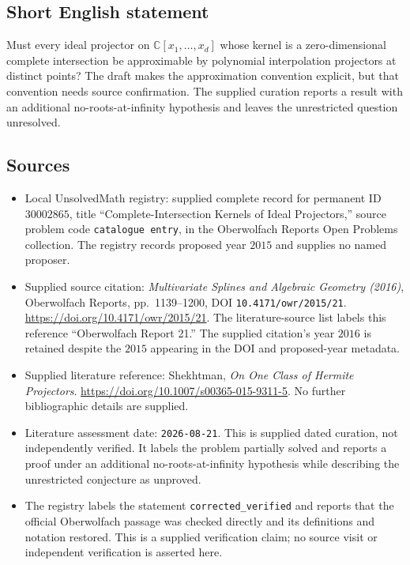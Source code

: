 \documentclass[11pt]{article}
\newcommand{\C}{\mathbb{C}}
\begin{document}
\subsection{Short English statement}
Must every ideal projector on \(\C[x_1,\ldots,x_d]\) whose kernel is a zero-dimensional complete intersection be approximable by polynomial interpolation projectors at distinct points? The draft makes the approximation convention explicit, but that convention needs source confirmation. The supplied curation reports a result with an additional no-roots-at-infinity hypothesis and leaves the unrestricted question unresolved.
\subsection{Sources}
\begin{itemize}
\item Local UnsolvedMath registry: supplied complete record for permanent ID \(30002865\), title ``Complete-Intersection Kernels of Ideal Projectors,'' source problem code \texttt{catalogue entry}, in the Oberwolfach Reports Open Problems collection. The registry records proposed year \(2015\) and supplies no named proposer.
\item Supplied source citation: \emph{Multivariate Splines and Algebraic Geometry (2016)}, Oberwolfach Reports, pp.\ 1139--1200, DOI \texttt{10.4171/owr/2015/21}. \url{https://doi.org/10.4171/owr/2015/21}. The literature-source list labels this reference ``Oberwolfach Report 21.'' The supplied citation's year \(2016\) is retained despite the \(2015\) appearing in the DOI and proposed-year metadata.
\item Supplied literature reference: Shekhtman, \emph{On One Class of Hermite Projectors}. \url{https://doi.org/10.1007/s00365-015-9311-5}. No further bibliographic details are supplied.
\item Literature assessment date: \texttt{2026-08-21}. This is supplied dated curation, not independently verified. It labels the problem partially solved and reports a proof under an additional no-roots-at-infinity hypothesis while describing the unrestricted conjecture as unproved.
\item The registry labels the statement \texttt{corrected\_verified} and reports that the official Oberwolfach passage was checked directly and its definitions and notation restored. This is a supplied verification claim; no source visit or independent verification is asserted here.
\end{itemize}
\end{document}
